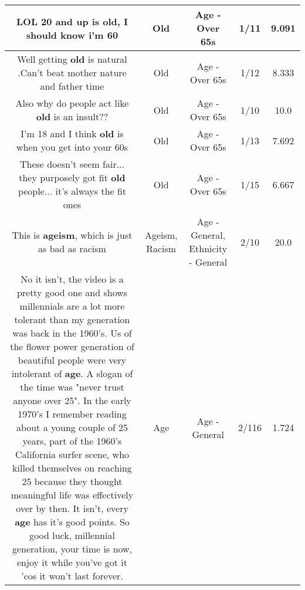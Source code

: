 \documentclass[11pt]{article}
\newlength\mylength
\begin{document}
\begin{center}
\begin{longtable}{|C{.65\mylength}|C{.30\mylength}|C{.12\mylength}|C{.12\mylength}|C{.12\mylength}|}
  \small LOL 20 and up is \textbf{old}, I should know i'm 60\normalsize   & Old & Age - Over 65s & 1/11 & 9.091 \\  \hline
  \small Well getting \textbf{old} is natural .Can't beat mother nature and father time\normalsize   & Old & Age - Over 65s & 1/12 & 8.333 \\  \hline
  \small Also why do people act like \textbf{old} is an insult??\normalsize   & Old & Age - Over 65s & 1/10 & 10.0 \\  \hline
  \small I'm 18 and I think \textbf{old} is when you get into your 60s\normalsize   & Old & Age - Over 65s & 1/13 & 7.692 \\  \hline
  \small These doesn't seem fair... they purposely got fit \textbf{old} people... it's always the fit ones\normalsize   & Old & Age - Over 65s & 1/15 & 6.667 \\  \hline
  \small This is \textbf{ageism}, which is just as bad as racism\normalsize   & Ageism, Racism & Age - General, Ethnicity - General & 2/10 & 20.0 \\  \hline
  \small No it isn't, the video is a pretty good one and shows millennials are a lot more tolerant than my generation was back in the 1960's. Us of the flower power generation of beautiful people were very intolerant of \textbf{age}. A slogan of the time was "never trust anyone over 25". In the early 1970's I remember reading about a young couple of 25 years, part of the 1960's California surfer scene, who killed themselves on reaching 25 because they thought meaningful life was effectively over by then. It isn't, every \textbf{age} has it's good points. So good luck, millennial generation, your time is now, enjoy it while you've got it 'cos it won't last forever.\normalsize   & Age & Age - General & 2/116 & 1.724 \\  \hline

\end{longtable}
\end{center}
\end{document}
